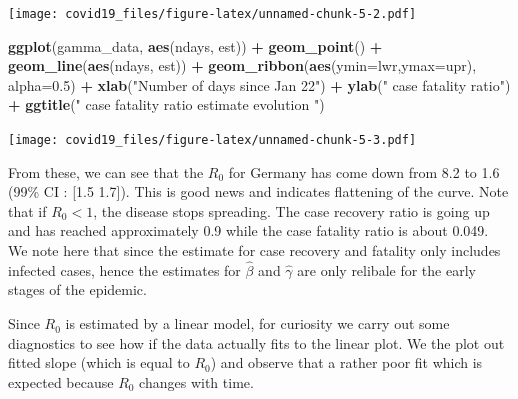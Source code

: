 \documentclass[]{article}
\newenvironment{Shaded}{\begin{snugshade}}{\end{snugshade}}
\newcommand{\DataTypeTok}[1]{\textcolor[rgb]{0.13,0.29,0.53}{#1}}
\newcommand{\FloatTok}[1]{\textcolor[rgb]{0.00,0.00,0.81}{#1}}
\newcommand{\KeywordTok}[1]{\textcolor[rgb]{0.13,0.29,0.53}{\textbf{#1}}}
\newcommand{\NormalTok}[1]{#1}
\newcommand{\OperatorTok}[1]{\textcolor[rgb]{0.81,0.36,0.00}{\textbf{#1}}}
\newcommand{\StringTok}[1]{\textcolor[rgb]{0.31,0.60,0.02}{#1}}
\begin{document}
\texttt{[image: covid19\_files/figure-latex/unnamed-chunk-5-2.pdf]}

\begin{Shaded}
\begin{Highlighting}[]
\KeywordTok{ggplot}\NormalTok{(gamma_data, }\KeywordTok{aes}\NormalTok{(ndays, est)) }\OperatorTok{+}\StringTok{ }\KeywordTok{geom_point}\NormalTok{() }\OperatorTok{+}\StringTok{ }\KeywordTok{geom_line}\NormalTok{(}\KeywordTok{aes}\NormalTok{(ndays, est)) }\OperatorTok{+}\StringTok{ }\KeywordTok{geom_ribbon}\NormalTok{(}\KeywordTok{aes}\NormalTok{(}\DataTypeTok{ymin=}\NormalTok{lwr,}\DataTypeTok{ymax=}\NormalTok{upr), }\DataTypeTok{alpha=}\FloatTok{0.5}\NormalTok{) }\OperatorTok{+}\StringTok{ }\KeywordTok{xlab}\NormalTok{(}\StringTok{"Number of days since Jan 22"}\NormalTok{) }\OperatorTok{+}\StringTok{ }\KeywordTok{ylab}\NormalTok{(}\StringTok{" case fatality ratio"}\NormalTok{) }\OperatorTok{+}\StringTok{ }\KeywordTok{ggtitle}\NormalTok{(}\StringTok{" case fatality ratio estimate evolution "}\NormalTok{)}
\end{Highlighting}
\end{Shaded}

\texttt{[image: covid19\_files/figure-latex/unnamed-chunk-5-3.pdf]}

From these, we can see that the \(R_{0}\) for Germany has come down from
8.2 to 1.6 (99\% CI : {[}1.5 1.7{]}). This is good news and indicates
flattening of the curve. Note that if \(R_{0} < 1\), the disease stops
spreading. The case recovery ratio is going up and has reached
approximately 0.9 while the case fatality ratio is about 0.049. We note
here that since the estimate for case recovery and fatality only
includes infected cases, hence the estimates for \(\hat{\beta}\) and
\(\hat{\gamma}\) are only relibale for the early stages of the epidemic.

Since \(R_{0}\) is estimated by a linear model, for curiosity we carry
out some diagnostics to see how if the data actually fits to the linear
plot. We the plot out fitted slope (which is equal to \(R_{0}\)) and
observe that a rather poor fit which is expected because \(R_{0}\)
changes with time.
\end{document}
